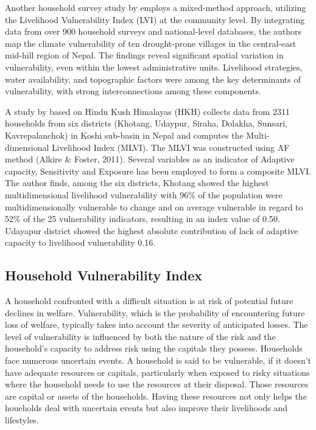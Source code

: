 Another household survey study by \cite{mainali2019mapping} employs a mixed-method approach, utilizing the Livelihood Vulnerability Index (LVI) at the community level. By integrating data from over 900 household surveys and national-level databases, the authors map the climate vulnerability of ten drought-prone villages in the central-east mid-hill region of Nepal. The findings reveal significant spatial variation in vulnerability, even within the lowest administrative units. Livelihood strategies, water availability, and topographic factors were among the key determinants of vulnerability, with strong interconnections among these components.\par 

A study by \cite{gerlitz2017multidimensional} based on Hindu Kush Himalayas (HKH) collects data from 2311 households from six districts (Khotang, Udaypur, Siraha, Dolakha, Sunsari, Kavrepalanchok) in Koshi sub-basin in Nepal and computes the Multi-dimensional Livelihood Index (MLVI). The MLVI was constructed using  AF method (Alkire \& Foster, 2011). Several variables as an indicator of Adaptive capacity, Sensitivity and Exposure has been employed to form a composite MLVI. The author finds, among the six districts, Khotang showed the highest multidimensional livelihood vulnerability with 96\% of the population were multidimensionally vulnerable to change and on average vulnerable in regard to 52\% of the 25 vulnerability indicators, resulting in an index value of 0.50.  Udayapur district showed the highest absolute contribution of lack of adaptive capacity to livelihood vulnerability 0.16.\par
 
\subsection{Household Vulnerability Index} \label{subsec:HVI}
A household confronted with a difficult situation is at risk of potential future declines in welfare. Vulnerability, which is the probability of encountering future loss of welfare, typically takes into account the severity of anticipated losses. The level of vulnerability is influenced by both the nature of the risk and the household's capacity to address risk using the capitals they possess. Households face numerous uncertain events. A household is said to be vulnerable, if it doesn't have adequate resources or capitals, particularly when exposed to risky situations where the household needs to use the resources at their disposal. Those resources are capital or assets of the households. Having these resources not only helps the houeholds deal with uncertain events but also improve their livelihoods and lifestyles.\par 

